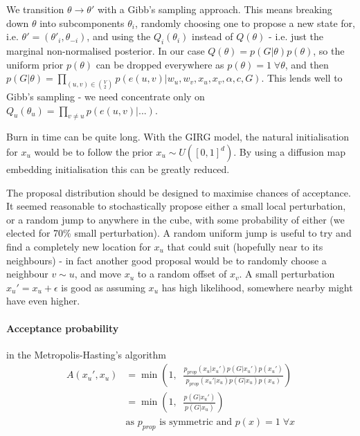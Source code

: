 We transition $\theta \to \theta'$ with a Gibb's sampling approach. This means breaking down $\theta$ into subcomponents $\theta_i$, randomly choosing one to propose a new state for, i.e. $\theta' = (\theta'_i, \theta_{-i})$, and using the $Q_i(\theta_i)$ instead of $Q(\theta)$ - i.e. just the marginal non-normalised posterior.
In our case $Q(\theta) = p(G | \theta) p(\theta)$, so the uniform prior $p(\theta)$ can be dropped everywhere as $p(\theta) = 1\; \forall \theta$, and then $p(G | \theta) = \prod_{(u,v) \in {V \choose 2}} p(e(u,v) | w_u, w_v, x_u, x_v, \alpha, c, G)$.
This lends well to Gibb's sampling - we need concentrate only on $Q_u(\theta_u) = \prod_{v \neq u} p(e(u,v) | ...)$.


Burn in time can be quite long. With the GIRG model, the natural initialisation for $x_u$ would be to follow the prior $x_u \sim U([0, 1]^d)$. By using a diffusion map embedding initialisation this can be greatly reduced.

The proposal distribution should be designed to maximise chances of acceptance. It seemed reasonable to stochastically propose either a small local perturbation, or a random jump to anywhere in the cube, with some probability of either (we elected for 70\% small perturbation). A random uniform jump is useful to try and find a completely new location for $x_u$ that could suit (hopefully near to its neighbours) - in fact another good proposal would be to randomly choose a neighbour $v \sim u$, and move $x_u$ to a random offset of $x_v$. A small perturbation $x_u' = x_u + \epsilon$ is good as assuming $x_u$ has high likelihood, somewhere nearby might have even higher.

\paragraph{Acceptance probability} in the Metropolis-Hasting's algorithm
\begin{align}
  A(x_u', x_u) &= \min \left (1,\;\;  \frac{p_{prop}(x_u | x_u') p(G | x_u') p(x_u')}{p_{prop}(x_u' | x_u) p(G | x_u) p(x_u)}\right )
  \\
  &= \min \left (1,\;\;  \frac{p(G | x_u')}{p(G | x_u)} \right )
  \\
  & \text{as $p_{prop}$ is symmetric and $p(x) = 1\; \forall x$}
\end{align}

